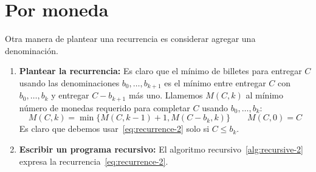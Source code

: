 \documentclass[english, spanish, fleqn]{article}
\begin{document}
\section{Por moneda}
\label{sec:by-bill}

  Otra manera de plantear una recurrencia
  es considerar agregar una denominación.
  \begin{enumerate}[label = {(\alph*)}]
  \item \textbf{Plantear la recurrencia:}
    Es claro que el mínimo de billetes para entregar \(C\)
    usando las denominaciones \(b_0, \dotsc, b_{k + 1}\)
    es el mínimo entre entregar \(C\) con \(b_0, \dotsc, b_k\)
    y entregar \(C - b_{k + 1}\) más uno.
    Llamemos \(M(C, k)\) al mínimo número de monedas
    requerido para completar \(C\) usando \(b_0, \dotsc, b_k\):
    \begin{equation}
      \label{eq:recurrence-2}
      M(C, k)
        = \min\{
                 M(C, k - 1) + 1, M(C - b_k, k)
              \}
      \qquad
      M(C, 0)
        = C
    \end{equation}
    Es claro que debemos usar~\eqref{eq:recurrence-2} solo si \(C \le b_k\).
  \item \textbf{Escribir un programa recursivo:}
    El algoritmo recursivo~\ref{alg:recursive-2}
    expresa la recurrencia~\eqref{eq:recurrence-2}.
    \begin{algorithm}
      \DontPrintSemicolon\Indp



\end{algorithm}
\end{enumerate}
\end{document}
